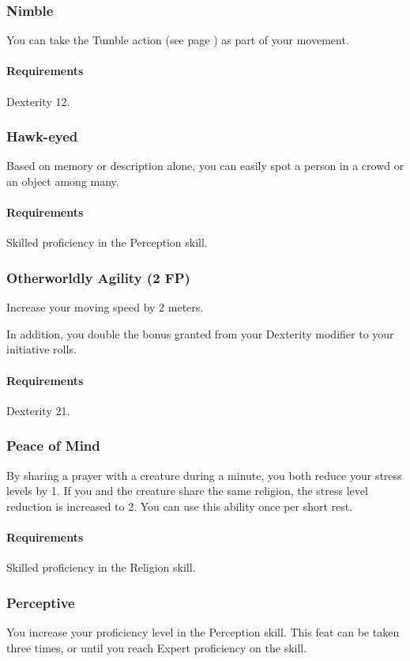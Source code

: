 \subsubsection{Nimble} \label{feat::nimble}
    You can take the Tumble action (see page \pageref{act::tumble}) as part of your movement.
    \paragraph{Requirements} Dexterity 12.
\subsubsection{Hawk-eyed} \label{feat::hawkeyed}
    Based on memory or description alone, you can easily spot a person in a crowd or an object among many.
    \paragraph{Requirements} Skilled proficiency in the Perception skill.
\subsubsection{Otherworldly Agility (2 FP)} \label{feat::otherworldlyagility}
    Increase your moving speed by 2 meters.

    In addition, you double the bonus granted from your Dexterity modifier to your initiative rolls.
    \paragraph{Requirements} Dexterity 21.
\subsubsection{Peace of Mind} \label{feat::peaceofmind}
    By sharing a prayer with a creature during a minute, you both reduce your stress levels by 1.
    If you and the creature share the same religion, the stress level reduction is increased to 2.
    You can use this ability once per short rest.
    \paragraph{Requirements} Skilled proficiency in the Religion skill.
\subsubsection{Perceptive} \label{feat::perceptive}
    You increase your proficiency level in the Perception skill.
    This feat can be taken three times, or until you reach Expert proficiency on the skill.
